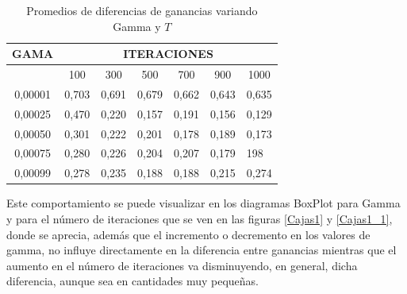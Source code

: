 \begin{table}[]
\centering
\caption{Promedios de diferencias de ganancias variando Gamma y $T$}
\begin{tabular}{cllllll}
GAMA                 & \multicolumn{6}{c}{ITERACIONES}    \\ \hline
\multicolumn{1}{l}{} & \multicolumn{1}{c}{100} & \multicolumn{1}{c}{300} & \multicolumn{1}{c}{500} & \multicolumn{1}{c}{700} & \multicolumn{1}{c}{900} & \multicolumn{1}{c}{1000} \\ \hline
0,00001              & 0,703                   & 0,691                    & 0,679                   & 0,662                   & 0,643                   & 0,635                    \\
0,00025              & 0,470                   & 0,220                   & 0,157                   & 0,191                   & 0,156                   & 0,129                    \\
0,00050              & 0,301                    & 0,222                   & 0,201                   & 0,178                   & 0,189                   & 0,173                    \\
0,00075              & 0,280                    & 0,226                   & 0,204                   & 0,207                    & 0,179                   & 198                     \\
0,00099              & 0,278                   & 0,235                   & 0,188                   & 0,188                   & 0,215                     & 0,274      \\ \hline             
\end{tabular}
\label{exp0}
\end{table}

Este comportamiento se puede visualizar en los diagramas BoxPlot para Gamma y para el número de iteraciones que se ven en las figuras \ref{Cajas1} y \ref{Cajas1_1}, donde se aprecia, además que el incremento o decremento en los valores de gamma, no influye directamente en la diferencia entre ganancias mientras que el aumento en el número de iteraciones va disminuyendo, en general, dicha diferencia, aunque sea en cantidades muy pequeñas.

